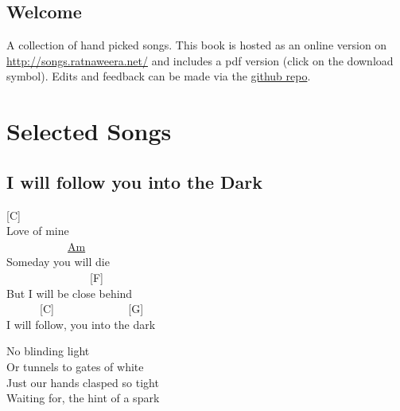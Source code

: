 \documentclass[
  letterpaper,
]{scrbook}
\renewcommand*\contentsname{Table of contents}
\newcommand\contentsname{Table of contents}
\begin{document}
\renewcommand*\contentsname{Table of contents}
{
\setcounter{tocdepth}{2}
\tableofcontents
}
\mainmatter
{}

\hypertarget{title}{%
\chapter*{Welcome}\label{title}}


A collection of hand picked songs. This book is hosted as an online
version on \url{http://songs.ratnaweera.net/} and includes a pdf version
(click on the download symbol). Edits and feedback can be made via the
\href{https://github.com/ratnanil/songs}{github repo}.

\part{Selected Songs}

\hypertarget{i-will-follow-you-into-the-dark}{%
\chapter{I will follow you into the
Dark}\label{i-will-follow-you-into-the-dark}}

{[}C{]}\\
Love of mine\\
\hspace*{0.333em} ~ ~ ~ ~ ~ ~ ~\href{D\%20root\%20note}{Am}\\
Someday you will die\\
\hspace*{0.333em} ~ ~ ~ ~ ~ ~ ~ ~ ~ {[}F{]}\\
But I will be close behind\\
\hspace*{0.333em} ~ ~ ~ ~{[}C{]} ~ ~ ~ ~ ~ ~ ~ ~{[}G{]}\\
I will follow, you into the dark

No blinding light\\
Or tunnels to gates of white\\
Just our hands clasped so tight\\
Waiting for, the hint of a spark
\end{document}
